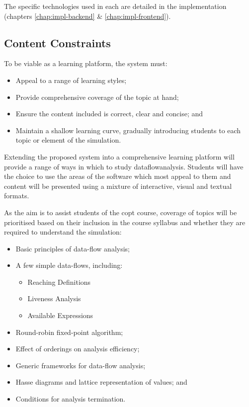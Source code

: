 \documentclass[bsc,twoside,singlespacing,parskip,logo,notimes,normalheadings]{infthesis}
\begin{document}
        The specific technologies used in each are detailed in the
        implementation (chapters \ref{chap:impl-backend} \&
        \ref{chap:impl-frontend}).

          
        \subsection{Content Constraints}
        To be viable as a learning platform, the system must:
        
        \begin{itemize}
        \item Appeal to a range of learning styles;
        \item Provide comprehensive coverage of the topic at hand;
        \item Ensure the content included is correct, clear and
          concise; and
        \item Maintain a shallow learning curve, gradually introducing
          students to each topic or element of the simulation.
        \end{itemize}

        Extending the proposed system into a comprehensive learning
        platform will provide a range of ways in which to study
        \gls{dataflowanalysis}. Students will have the choice to use
        the areas of the software which most appeal to them and
        content will be presented using a mixture of interactive,
        visual and textual formats.

        As the aim is to assist students of the \gls{copt} course,
        coverage of topics will be prioritised based on their
        inclusion in the course syllabus and whether they are required
        to understand the simulation:

        \begin{itemize}
        \item Basic principles of data-flow analysis;
        \item A few simple data-flows, including:
          \begin{itemize}
          \item Reaching Definitions
          \item Liveness Analysis
          \item Available Expressions
          \end{itemize}
        \item Round-robin fixed-point algorithm;
        \item Effect of orderings on analysis efficiency;
        \item Generic frameworks for data-flow analysis;
        \item Hasse diagrams and lattice representation of values; and
        \item Conditions for analysis termination.
        \end{itemize}        
\end{document}
